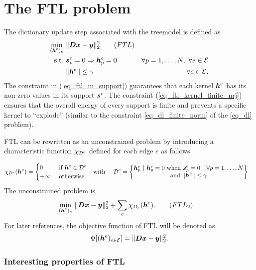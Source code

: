 \section{The \acs{FTL} problem}

The dictionary update step associated with the \gls{treemodel} is defined as
\begin{align}
\underset{\substack{(\bm{h}^e)_{e}}}\min ~ & \lVert \bm{D}\bm{x} - \bm{y} \rVert_2^2 \tag{$FTL$}\label{eq_ftl}\\
\text{s.t.~} & \bm{s}^e_p=0 \Rightarrow \bm{h}^e_p = 0 \quad & \forall p=1,\dots,N ,~\forall e \in \mathcal E\label{eq_ftl_in_support} \\
 & \lVert \bm{h}^e \rVert \le \gamma & \forall e \in \mathcal E.\label{eq_ftl_kernel_finite_nrj}
\end{align} 
The constraint in (\ref{eq_ftl_in_support}) guarantees that each kernel $\bm{h}^e$ has its non-zero values in its support $\bm{s}^e$. The constraint (\ref{eq_ftl_kernel_finite_nrj}) ensures that the overall energy of every support is finite and prevents a specific kernel to “explode” (similar to the constraint \eqref{eq_dl_finite_norm} of the \eqref{eq_dl} problem).

\ac{FTL} can be rewritten as an unconstrained problem by introducing a characteristic function $\chi_{{\mathcal D}^e}$ defined for each edge $e$ as follows

\begin{align*}
	\chi_{{\mathcal D}^e}(\bm{h}^e) = \begin{cases} 0 &\text{ if } \bm{h}^e \in {\mathcal D}^e \\ +\infty & \ \text{otherwise}\end{cases} & \quad \text{with} \quad \
		{\mathcal D}^e = \begin{Bmatrix}  \bm{h}^e_p ~|~ \bm{h}^e_p=0 ~\text{when}~ \bm{s}^e_p=0 \quad \forall p=1,\dots,N\\ \text{and }\lVert \bm{h}^e \rVert \le \gamma \end{Bmatrix}
\end{align*}
The unconstrained problem is
\begin{align}
\underset{\substack{(\h^e)_{e}}}\min ~ & \lVert \D\x - \y \rVert_2^2 + \sum_{e}\chi_{D_e} (\h^e). \tag{${FTL}_2$}\label{eq_ftl2}
\end{align}
For later references, the objective function of \ac{FTL} will be denoted as
\begin{align}
\Phi[(\bm{h}^e)_{e \in \mathcal E}] = \lVert \bm{D}\bm{x}-\bm{y} \rVert^2_2.
\end{align}


\subsubsection{Interesting properties of \ac{FTL}}

